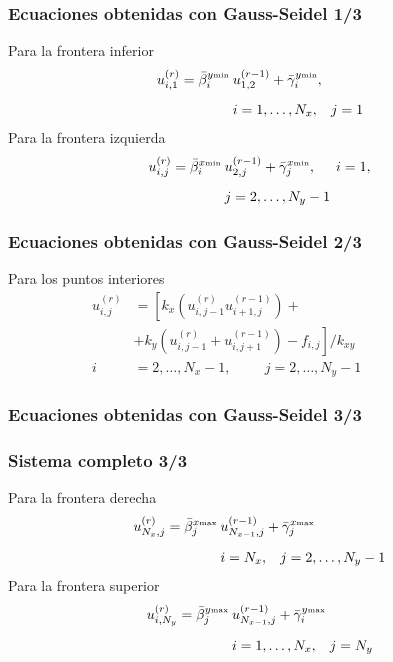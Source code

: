 \begin{frame}
\frametitle{Ecuaciones obtenidas con Gauss-Seidel 1/3}
Para la frontera inferior
\begin{align}
\begin{aligned}
u_{i, 1}^{(r)} = \bar{\beta}_{i}^{y {\text{\tiny{min}}}} \: &u_{1,2}^{(r-1)} + \bar{\gamma}_{i}^{y {\text{\tiny{min}}}}, \\[0.5em]
&i = 1, \ldots, N_{x}, \hspace{0.3cm} j = 1
\end{aligned}
\label{eq:ecuacion_13_24}
\end{align}
\pause
Para la frontera izquierda
\begin{align}
\begin{aligned}
u_{i, j}^{(r)} = \bar{\beta}_{i}^{x {\text{\tiny{min}}}} \: &u_{2, j}^{(r-1)} + \bar{\gamma}_{j}^{x {\text{\tiny{min}}}}, \hspace{0.5cm} i = 1, \\[0.5em]
&j = 2, \ldots, N_{y} - 1
\end{aligned}
\label{eq:ecuacion_13_25}
\end{align}
\end{frame}
\begin{frame}
\frametitle{Ecuaciones obtenidas con Gauss-Seidel 2/3}
Para los puntos interiores
\begin{equation}
\begin{aligned}
u_{i,j}^{(r)} &= \left[ k_{x} \left( u_{i, j-1}^{(r)} u_{i+1, j}^{(r-1)} \right) + \right. \\[0.5em]
&+ \left. k_{y} \left( u_{i, j-1}^{(r)} + u_{i, j+1}^{(r-1)} \right) - f_{i,j} \right] / k_{xy} \\[0.5em]
i &= 2, \ldots, N_{x} - 1, \hspace{1cm} j = 2, \ldots, N_{y} - 1 \hspace{2cm}
\end{aligned}
\label{eq:ecuacion_13_26}
\end{equation}    
\end{frame}
\begin{frame}
\frametitle{Ecuaciones obtenidas con Gauss-Seidel 3/3}
\frametitle{Sistema completo 3/3}
Para la frontera derecha
\begin{align}
\begin{aligned}
u_{N_{x},j}^{(r)} = \bar{\beta}_{j}^{x {\text{\tiny{max}}}} \: &u_{N_{x-1}, j}^{(r-1)} + \bar{\gamma}_{j}^{x {\text{\tiny{max}}}} \\[0.5em]
&i = N_{x}, \hspace{0.3cm} j = 2, \ldots, N_{y} - 1
\end{aligned}
\label{eq:ecuacion_13_27}
\end{align}
\pause
Para la frontera superior
\begin{align}
\begin{aligned}
u_{i, N_{y}}^{(r)} = \bar{\beta}_{j}^{y {\text{\tiny{max}}}} \: &u_{N_{x-1}, j}^{(r-1)} + \bar{\gamma}_{i}^{y {\text{\tiny{max}}}} \\[0.5em]
&i = 1, \ldots, N_{x}, \hspace{0.3cm} j = N_{y}
\end{aligned}
\label{eq:ecuacion_13_28}
\end{align}
\end{frame}
